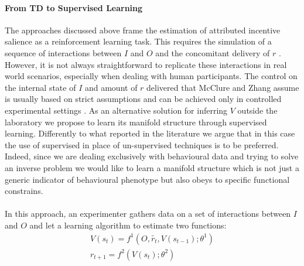 \paragraph*{\textbf{From TD to Supervised Learning}}
\label{td_to_supervised}The approaches discussed above frame the estimation of attributed incentive salience as a reinforcement learning task. This requires the simulation of a sequence of interactions between $I$ and $O$ and the concomitant delivery of $r$  \cite{schultz1997neural,mcclure2003computational,zhang2009neural}. However, it is not always straightforward to replicate these interactions in real world scenarios, especially when dealing with human participants. The control on the internal state of $I$ and amount of $r$ delivered that McClure and Zhang assume is usually based on strict assumptions and can be achieved only in controlled experimental settings \cite{mcclure2003computational,zhang2009neural}. As an alternative solution for inferring $V$ outside the laboratory we propose to learn its manifold structure through supervised learning. Differently to what reported in the literature \cite{calhoun2019unsupervised, mccullough2021unsupervised, luxem2020identifying, pereira2020quantifying, shi2021learning} we argue that in this case the use of supervised in place of un-supervised techniques is to be preferred. Indeed, since we are dealing exclusively with behavioural data and trying to solve an inverse problem  we would like to learn a manifold structure which is not just a generic indicator of behavioural phenotype \cite{luxem2020identifying} but also obeys to specific functional constrains.\\
\\
In this approach, an experimenter gathers data on a set of interactions between $I$ and $O$ and let a learning algorithm to estimate two functions:
\begin{gather}
\label{supervised_v}
    V(s_{t}) = f^{1}(O, \tilde{r_{t}}, V(s_{t-1}); \theta^{1}) \\
    r_{t+1} = f^{2}(V(s_{t}); \theta^{2}) \nonumber
\end{gather}
